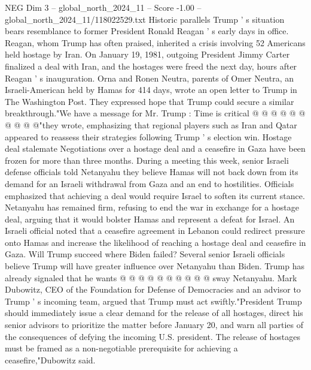 \begin{textsample}{NEG Dim 3 – global\_north\_2024\_11 – Score -1.00 – global\_north\_2024\_11/118022529.txt}
Historic parallels Trump ' s situation bears resemblance to former President Ronald Reagan ' s early days in office.
Reagan, whom Trump has often praised, inherited a crisis involving 52 Americans held hostage by Iran.
On January 19, 1981, outgoing President Jimmy Carter finalized a deal with Iran, and the hostages were freed the next day, hours after Reagan ' s inauguration.
Orna and Ronen Neutra, parents of Omer Neutra, an Israeli-American held by Hamas for 414 days, wrote an open letter to Trump in The Washington Post.
They expressed hope that Trump could secure a similar breakthrough."We have a message for Mr.
Trump : Time is critical @ @ @ @ @ @ @ @ @ @"they wrote, emphasizing that regional players such as Iran and Qatar appeared to reassess their strategies following Trump ' s election win.
Hostage deal stalemate Negotiations over a hostage deal and a ceasefire in Gaza have been frozen for more than three months.
During a meeting this week, senior Israeli defense officials told Netanyahu they believe Hamas will not back down from its demand for an Israeli withdrawal from Gaza and an end to hostilities.
Officials emphasized that achieving a deal would require Israel to soften its current stance.
Netanyahu has remained firm, refusing to end the war in exchange for a hostage deal, arguing that it would bolster Hamas and represent a defeat for Israel.
An Israeli official noted that a ceasefire agreement in Lebanon could redirect pressure onto Hamas and increase the likelihood of reaching a hostage deal and ceasefire in Gaza.
Will Trump succeed where Biden failed?
Several senior Israeli officials believe Trump will have greater influence over Netanyahu than Biden.
Trump has already signaled that he wants @ @ @ @ @ @ @ @ @ @ sway Netanyahu.
Mark Dubowitz, CEO of the Foundation for Defense of Democracies and an advisor to Trump ' s incoming team, argued that Trump must act swiftly."President Trump should immediately issue a clear demand for the release of all hostages, direct his senior advisors to prioritize the matter before January 20, and warn all parties of the consequences of defying the incoming U.S. president.
The release of hostages must be framed as a non-negotiable prerequisite for achieving a ceasefire,"Dubowitz said.

\end{textsample}
